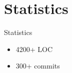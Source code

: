 \section{Statistics}

\begin{frame}{Statistics}
\begin{itemize}
	\item 4200+ LOC
	\item 300+ commits
\end{itemize}
\end{frame}
